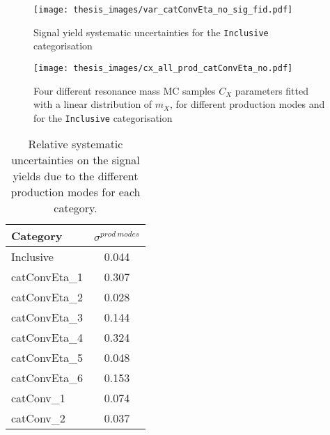 \documentclass[a4paper, oneside, 11pt, openright]{book}
\begin{document}
\begin{itemize}
 					\begin{center}
 						\begin{figure}
 							\centering
 							\texttt{[image: thesis\_images/var\_catConvEta\_no\_sig\_fid.pdf]}
 							\caption{Signal yield systematic uncertainties for the \texttt{Inclusive} categorisation}
 							\label{fig:yield_syst}
 						\end{figure}
 						\begin{figure}
 							\centering
 							\texttt{[image: thesis\_images/cx\_all\_prod\_catConvEta\_no.pdf]}
 							\caption{Four different resonance mass MC samples $C_X$ parameters fitted with a linear distribution of $m_X$, for different production modes and for the \texttt{Inclusive} categorisation}
 							\label{fig:prod_mode_syst}
 						\end{figure}
 						\begin{table}[tbp]
 							\centering
 							\begin{tabular}{lc}
 								\toprule[1.5pt]
 								Category		& $\sigma^{prod\ modes}$	\\
 								\midrule
 								Inclusive		& 0.044				\\
 								\midrule
 								catConvEta\_1 	& 0.307				\\
 								catConvEta\_2 	& 0.028				\\
 								catConvEta\_3 	& 0.144				\\
 								catConvEta\_4 	& 0.324				\\
 								catConvEta\_5 	& 0.048				\\
 								catConvEta\_6 	& 0.153				\\
 								\midrule
 								catConv\_1 		& 0.074				\\
 								catConv\_2 		& 0.037				\\
 								\bottomrule[1.5pt]
 							\end{tabular}
 							\caption{Relative systematic uncertainties on the signal yields due to the different production modes for each category.}
 							\label{tab:prod_mode}
 						\end{table}
 					\end{center}
 				\end{itemize} 
\end{document}
